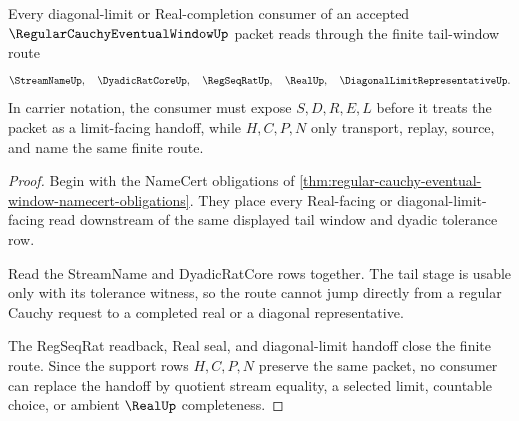 \begin{theorem}
\label{thm:regular-cauchy-eventual-window-tail-handoff}
Every diagonal-limit or Real-completion consumer of an accepted $\RegularCauchyEventualWindowUp$ packet reads through the finite tail-window route
$$
\StreamNameUp,\quad
\DyadicRatCoreUp,\quad
\RegSeqRatUp,\quad
\RealUp,\quad
\DiagonalLimitRepresentativeUp .
$$
In carrier notation, the consumer must expose $S,D,R,E,L$ before it treats the packet as a limit-facing handoff, while $H,C,P,N$ only transport, replay, source, and name the same finite route.
\end{theorem}
\begin{proof}
Begin with the NameCert obligations of \autoref{thm:regular-cauchy-eventual-window-namecert-obligations}. They place every Real-facing or diagonal-limit-facing read downstream of the same displayed tail window and dyadic tolerance row.

Read the StreamName and DyadicRatCore rows together. The tail stage is usable only with its tolerance witness, so the route cannot jump directly from a regular Cauchy request to a completed real or a diagonal representative.

The RegSeqRat readback, Real seal, and diagonal-limit handoff close the finite route. Since the support rows $H,C,P,N$ preserve the same packet, no consumer can replace the handoff by quotient stream equality, a selected limit, countable choice, or ambient $\RealUp$ completeness.
\end{proof}


\begin{closurestatus}{\RegularCauchyEventualWindowUp}
  \theoryclosure{\seedClosure}
  \formalstatus{\unformalizedV}
\end{closurestatus}
